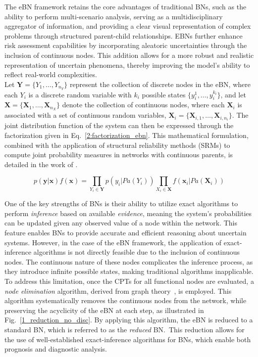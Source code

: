 The eBN framework retains the core advantages of traditional BNs, such as the ability to perform multi-scenario analysis, serving as a multidisciplinary aggregator of information, and providing a clear visual representation of complex problems through structured parent-child relationships. 
EBNs further enhance risk assessment capabilities by incorporating aleatoric uncertainties through the inclusion of continuous nodes.
This addition allows for a more robust and realistic representation of uncertain phenomena, thereby improving the model's ability to reflect real-world complexities.\\

Let $\mathbf{Y} = \{Y_1, \ldots, Y_{n_Y}\}$ represent the collection of discrete nodes in the eBN, where each $Y_i$ is a discrete random variable with $k_i$ possible states $\{y_i^1, \ldots, y_i^{k_i}\}$, and let $\mathbf{X} = \{\mathbf{X}_1, \ldots, \mathbf{X}_{n_X}\}$ denote the collection of continuous nodes, where each $\mathbf{X}_i$ is associated with a set of continuous random variables, $\mathbf{X}_i = \{\mathbf{X}_{i,1}, \ldots, \mathbf{X}_{i,n_i}\}$. 
The joint distribution function of the system can then be expressed through the factorization given in Eq.~\ref{2:factorization_ebn}. 
This mathematical formulation, combined with the application of structural reliability methods (SRMs) to compute joint probability measures in networks with continuous parents, is detailed in the work of \textcite{straub_bayesian_2010}.

\begin{equation}
    \label{2:factorization_ebn}
    p(\mathbf{y}|\mathbf{x})f(\mathbf{x}) = \prod_{Y_i\in \mathbf{Y}} p(y_i|Pa(Y_i)) \prod_{X_i\in \mathbf{X}} f(\mathbf{x}_i|Pa(\mathbf{X}_i)) 
\end{equation}

One of the key strengths of BNs is their ability to utilize exact algorithms to perform \textit{inference} based on available \textit{evidence}, meaning the system's probabilities can be updated given any observed value of a node within the network.
This feature enables BNs to provide accurate and efficient reasoning about uncertain systems. However, in the case of the eBN framework, the application of exact-inference algorithms is not directly feasible due to the inclusion of continuous nodes.
The continuous nature of these nodes complicates the inference process, as they introduce infinite possible states, making traditional algorithms inapplicable.  
To address this limitation, once the CPTs for all functional nodes are evaluated, a \textit{node elimination} algorithm, derived from graph theory~\cite{Shachter86a}, is employed. 
This algorithm systematically removes the continuous nodes from the network, while preserving the acyclicity of the eBN at each step, as illustrated in Fig.~\ref{1_reduction_no_disc}. 
By applying this algorithm, the eBN is reduced to a standard BN, which is referred to as the \textit{reduced} BN.\ This reduction allows for the use of well-established exact-inference algorithms for BNs, which enable both prognosis and diagnostic analysis. \\

